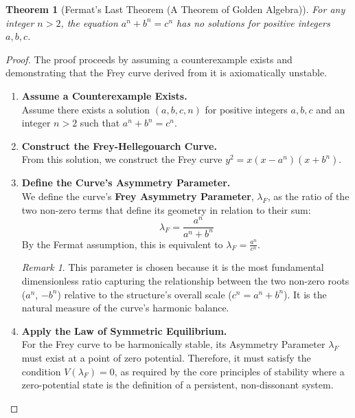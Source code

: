 \documentclass{amsart}
\theoremstyle{plain}
\newtheorem{theorem}{Theorem}[section]
\theoremstyle{definition}
\theoremstyle{remark}
\newtheorem*{remark}{Remark}
\begin{document}
\begin{theorem}[Fermat's Last Theorem (A Theorem of Golden Algebra)]
For any integer $n > 2$, the equation $a^n + b^n = c^n$ has no solutions for positive integers $a, b, c$.
\end{theorem}
\begin{proof}
The proof proceeds by assuming a counterexample exists and demonstrating that the Frey curve derived from it is axiomatically unstable.

\begin{enumerate}
    \item \textbf{Assume a Counterexample Exists.} \\
    Assume there exists a solution $(a, b, c, n)$ for positive integers $a, b, c$ and an integer $n>2$ such that $a^n + b^n = c^n$.

    \item \textbf{Construct the Frey-Hellegouarch Curve.} \\
    From this solution, we construct the Frey curve $y^2 = x(x - a^n)(x + b^n)$.

    \item \textbf{Define the Curve's Asymmetry Parameter.} \\
    We define the curve's \textbf{Frey Asymmetry Parameter}, $\lambda_F$, as the ratio of the two non-zero terms that define its geometry in relation to their sum:
    \begin{equation}
        \lambda_F = \frac{a^n}{a^n + b^n}
    \end{equation}
    By the Fermat assumption, this is equivalent to $\lambda_F = \frac{a^n}{c^n}$.
    
    \begin{remark}
    This parameter is chosen because it is the most fundamental dimensionless ratio capturing the relationship between the two non-zero roots ($a^n$, $-b^n$) relative to the structure's overall scale ($c^n = a^n+b^n$). It is the natural measure of the curve's harmonic balance.
    \end{remark}

    \item \textbf{Apply the Law of Symmetric Equilibrium.} \\
    For the Frey curve to be harmonically stable, its Asymmetry Parameter $\lambda_F$ must exist at a point of zero potential. Therefore, it must satisfy the condition $V(\lambda_F) = 0$, as required by the core principles of stability where a zero-potential state is the definition of a persistent, non-dissonant system.


\end{enumerate}
\end{proof}
\end{document}
